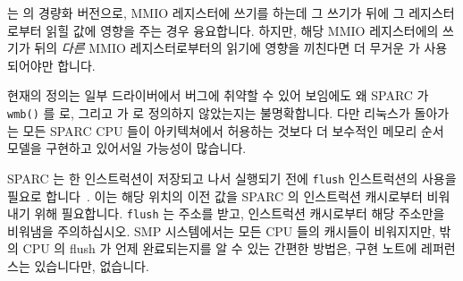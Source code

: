  는  의 경량화 버전으로, MMIO
레지스터에 쓰기를 하는데 그 쓰기가 뒤에 그 레지스터로부터 읽힐 값에 영향을 주는
경우 융요합니다.
하지만, 해당 MMIO 레지스터에의 쓰기가 뒤의 {\em 다른} MMIO 레지스터로부터의
읽기에 영향을 끼친다면 더 무거운  가 사용되어야만
합니다.

현재의 정의는 일부 드라이버에서 버그에 취약할 수 있어 보임에도 왜 SPARC 가 {\tt
wmb()} 를  로, 그리고  가
 로 정의하지 않았는지는 불명확합니다.
다만 리눅스가 돌아가는 모든 SPARC CPU 들이 아키텍쳐에서 허용하는 것보다 더
보수적인 메모리 순서 모델을 구현하고 있어서일 가능성이 많습니다.

SPARC 는 한 인스트럭션이 저장되고 나서 실행되기 전에 {\tt flush} 인스트럭션의
사용을 필요로 합니다~\cite{SPARC94}.
이는 해당 위치의 이전 값을 SPARC 의 인스트럭션 캐시로부터 비워내기 위해
필요합니다.
{\tt flush} 는 주소를 받고, 인스트럭션 캐시로부터 해당 주소만을 비워냄을
주의하십시오.
SMP 시스템에서는 모든 CPU 들의 캐시들이 비워지지만, 밖의 CPU 의 flush 가 언제
완료되는지를 알 수 있는 간편한 방법은, 구현 노트에 레퍼런스는 있습니다만,
없습니다.

